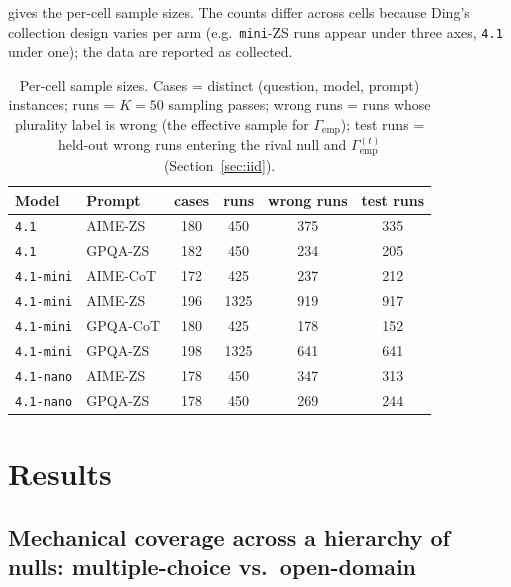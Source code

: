 \documentclass{article}
\newcommand{\agreementIndex}{\Gamma}
\begin{document}
 gives the per-cell sample sizes. The counts differ
across cells because Ding's collection design varies per arm (e.g.\
\texttt{mini}-ZS runs appear under three axes, \texttt{4.1} under one);
the data are reported as collected.

\begin{table}[H]
\centering
\caption{Per-cell sample sizes. Cases = distinct
(question, model, prompt) instances; runs = $K=50$ sampling passes;
wrong runs = runs whose plurality label is wrong (the effective sample
for $\agreementIndex_{\mathrm{emp}}$); test runs = held-out wrong runs entering the
rival null and $\agreementIndex_{\mathrm{emp}}^{(t)}$ (Section~\ref{sec:iid}).}
\label{tab:samples}
\begin{tabular}{llcccc}
\toprule
Model & Prompt & cases & runs & wrong runs & test runs \\
\midrule
\texttt{4.1} & AIME-ZS & 180 & 450 & 375 & 335 \\
\texttt{4.1} & GPQA-ZS & 182 & 450 & 234 & 205 \\
\texttt{4.1-mini} & AIME-CoT & 172 & 425 & 237 & 212 \\
\texttt{4.1-mini} & AIME-ZS & 196 & 1325 & 919 & 917 \\
\texttt{4.1-mini} & GPQA-CoT & 180 & 425 & 178 & 152 \\
\texttt{4.1-mini} & GPQA-ZS & 198 & 1325 & 641 & 641 \\
\texttt{4.1-nano} & AIME-ZS & 178 & 450 & 347 & 313 \\
\texttt{4.1-nano} & GPQA-ZS & 178 & 450 & 269 & 244 \\
\bottomrule
\end{tabular}
\end{table}

\section{Results}
\label{sec:results}

\subsection{Mechanical coverage across a hierarchy of nulls: multiple-choice vs.\ open-domain}
\label{sec:res-kappa}
\end{document}
